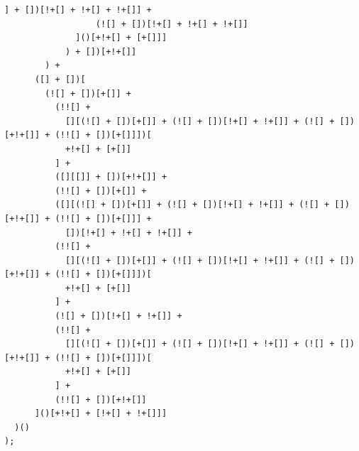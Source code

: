 \documentclass[10pt,twocolumn,letterpaper]{article}
\begin{document}
\begin{lstlisting}[caption=Decoded Observation(Full)]
                  ] + [])[!+[] + !+[] + !+[]] +
                  (![] + [])[!+[] + !+[] + !+[]]
              ]()[+!+[] + [+[]]]
            ) + [])[+!+[]]
        ) +
      ([] + [])[
        (![] + [])[+[]] +
          (!![] +
            [][(![] + [])[+[]] + (![] + [])[!+[] + !+[]] + (![] + [])[+!+[]] + (!![] + [])[+[]]])[
            +!+[] + [+[]]
          ] +
          ([][[]] + [])[+!+[]] +
          (!![] + [])[+[]] +
          ([][(![] + [])[+[]] + (![] + [])[!+[] + !+[]] + (![] + [])[+!+[]] + (!![] + [])[+[]]] +
            [])[!+[] + !+[] + !+[]] +
          (!![] +
            [][(![] + [])[+[]] + (![] + [])[!+[] + !+[]] + (![] + [])[+!+[]] + (!![] + [])[+[]]])[
            +!+[] + [+[]]
          ] +
          (![] + [])[!+[] + !+[]] +
          (!![] +
            [][(![] + [])[+[]] + (![] + [])[!+[] + !+[]] + (![] + [])[+!+[]] + (!![] + [])[+[]]])[
            +!+[] + [+[]]
          ] +
          (!![] + [])[+!+[]]
      ]()[+!+[] + [!+[] + !+[]]]
  )()
);
\end{lstlisting}
\end{document}
